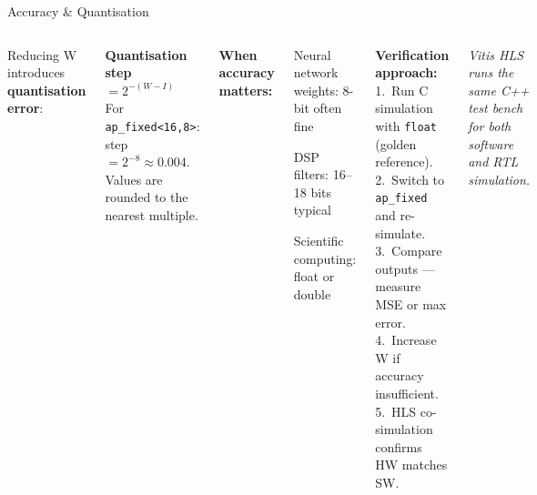 \documentclass[aspectratio=169,12pt]{beamer}
\begin{document}
\begin{frame}{Accuracy \& Quantisation}
\vspace{0.1cm}
\begin{columns}[T,totalwidth=\textwidth]


  {\small Reducing W introduces \textbf{quantisation error}:}
  \vspace{4pt}

  \colorbox{Orange!10}{\parbox{\dimexpr\linewidth-2\fboxsep\relax}{\vspace{3pt}
    {\color{Orange}\bfseries Quantisation step} $= 2^{-(W-I)}$\\[2pt]
    {\small For \texttt{ap\_fixed<16,8>}: step $= 2^{-8} \approx 0.004$.\\
    Values are rounded to the nearest multiple.}
  \vspace{3pt}}}

  \vspace{8pt}
  {\small\color{Navy}\bfseries When accuracy matters:}
  \begin{itemize}\setlength{\itemsep}{1pt}
    {\small
    \item Neural network weights: 8-bit often fine
    \item DSP filters: 16--18 bits typical
    \item Scientific computing: float or double}
  \end{itemize}


  \vspace{0.1cm}

  \colorbox{Teal!10}{\parbox{\dimexpr\linewidth-2\fboxsep\relax}{\vspace{4pt}
    {\color{Teal}\bfseries Verification approach:}\\[3pt]
    {\small
    1.\ Run C simulation with \texttt{float} (golden reference).\\[2pt]
    2.\ Switch to \texttt{ap\_fixed} and re-simulate.\\[2pt]
    3.\ Compare outputs — measure MSE or max error.\\[2pt]
    4.\ Increase W if accuracy insufficient.\\[2pt]
    5.\ HLS co-simulation confirms HW matches SW.}
  \vspace{4pt}}}

  \vspace{8pt}
  {\small\color{MidGray}\itshape Vitis HLS runs the same C++ test bench
  for both software and RTL simulation.}

\end{columns}
\end{frame}
\end{document}
